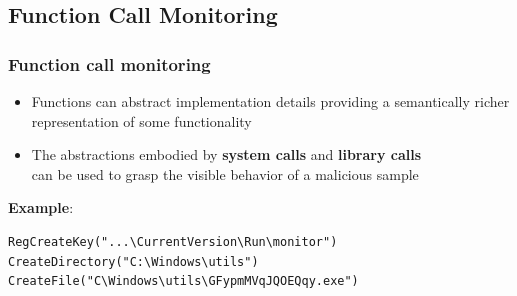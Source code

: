 \documentclass[compress]{beamer}
\begin{document}
\subsection{Function Call Monitoring}
\begin{frame}[fragile]
    \frametitle{Function call monitoring}

\begin{itemize}
\item Functions can abstract
implementation details providing
a semantically richer representation of some functionality
\item The abstractions embodied by \textbf{system calls} and \textbf{library calls} \\ can be used to grasp the visible behavior of a malicious sample 
\end{itemize}
\medskip
\textcolor{sapienza}{\textbf{Example}}:\\
\bigskip

\begin{beamerboxesrounded}[shadow=true]{}


\begin{lstlisting}[xleftmargin=0pt]
RegCreateKey("...\CurrentVersion\Run\monitor") 
CreateDirectory("C:\Windows\utils")
CreateFile("C\Windows\utils\GFypmMVqJQOEQqy.exe")
\end{lstlisting}

\end{beamerboxesrounded} 



\end{frame}
\end{document}

